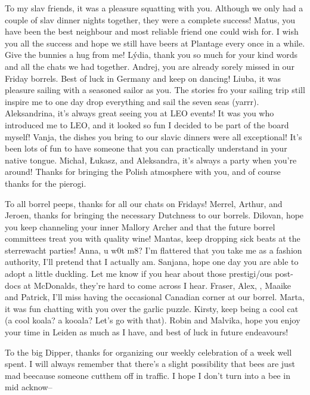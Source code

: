 \begin{thesisacknowledgements}
    To my slav friends, it was a pleasure squatting with you. Although we only had a couple of slav dinner nights together, they were a complete success! Matus, you have been the best neighbour and most reliable friend one could wish for. I wish you all the success and hope we still have beers at Plantage every once in a while. Give the bunnies a hug from me! L\'ydia, thank you so much for your kind words and all the chats we had together. Andrej, you are already sorely missed in our Friday borrels. Best of luck in Germany and keep on dancing! Liuba, it was pleasure sailing with a seasoned sailor as you. The stories fro your sailing trip still inspire me to one day drop everything and sail the seven seas (yarrr). Aleksandrina, it's always great seeing you at LEO events! It was you who introduced me to LEO, and it looked so fun I decided to be part of the board myself! Vanja, the dishes you bring to our slavic dinners were all exceptional! It's been lots of fun to have someone that you can practically understand in your native tongue.  Micha\l{}, \L{}ukasz, and Aleksandra, it's always a party when you're around! Thanks for bringing the Polish atmosphere with you, and of course thanks for the pierogi.

    To all borrel peeps, thanks for all our chats on Fridays! Merrel, Arthur, and Jeroen, thanks for bringing the necessary Dutchness to our borrels. Dilovan, hope you keep channeling your inner Mallory Archer and that the future borrel committees treat you with quality wine! Mantas, keep dropping sick beats at the sterrewacht parties! Anna, u w0t m8? I'm flattered that you take me as a fashion authority, I'll pretend that I actually am. Sanjana, hope one day you are able to adopt a little duckling. Let me know if you hear about those prestigi/ous post-docs at McDonalds, they're hard to come across I hear. Fraser, Alex, , Maaike and Patrick, I'll miss having the occasional Canadian corner at our borrel. Marta, it was fun chatting with you over the garlic puzzle. Kirsty, keep being a cool cat (a cool koala? a kooala? Let's go with that). Robin and Malvika, hope you enjoy your time in Leiden as much as I have, and best of luck in future endeavours!

    To the big Dipper, thanks for organizing our weekly celebration of a week well spent. I will always remember that there's a slight possibility that bees  are just mad  beecause someone cutthem off in traffic. I hope I don't turn into a bee in mid acknow--


\end{thesisacknowledgements}
